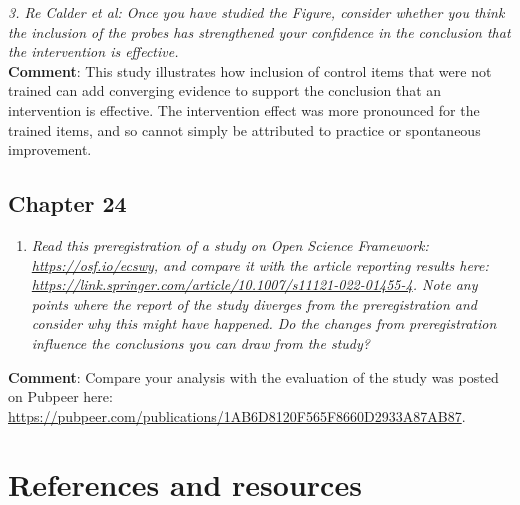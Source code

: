 \documentclass{krantz}
\providecommand{\tightlist}{%
\setlength{\itemsep}{0pt}\setlength{\parskip}{0pt}}
\begin{document}
\emph{3. Re Calder et al: Once you have studied the Figure, consider whether you think the inclusion of the probes has strengthened your confidence in the conclusion that the intervention is effective.}\\
\textbf{Comment}: This study illustrates how inclusion of control items that were not trained can add converging evidence to support the conclusion that an intervention is effective. The intervention effect was more pronounced for the trained items, and so cannot simply be attributed to practice or spontaneous improvement.

\hypertarget{chapter-24}{%
\section{Chapter 24}\label{chapter-24}}

\begin{enumerate}
\def\labelenumi{\arabic{enumi}.}
\tightlist
\item
  \emph{Read this preregistration of a study on Open Science Framework: \url{https://osf.io/ecswy}, and compare it with the article reporting results here: \url{https://link.springer.com/article/10.1007/s11121-022-01455-4}. Note any points where the report of the study diverges from the preregistration and consider why this might have happened. Do the changes from preregistration influence the conclusions you can draw from the study?}
\end{enumerate}

\textbf{Comment}: Compare your analysis with the evaluation of the study was posted on Pubpeer here: \url{https://pubpeer.com/publications/1AB6D8120F565F8660D2933A87AB87}.


\hypertarget{endmatter}{%
\chapter{References and resources}\label{endmatter}}
\end{document}
